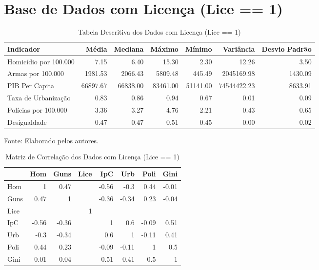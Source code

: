 \documentclass[12pt]{article}
\begin{document}
\section{\textbf{Base de Dados com Licença (Lice == 1)}}
\begin{table}[H]
\centering
\caption{Tabela Descritiva dos Dados com Licença (Lice == 1)}
\label{tab:indicadores_com_licença}
\small
\begin{tabularx}{\textwidth}{l*{6}{R}}
\hline
Indicador & Média & Mediana & Máximo & Mínimo & Variância & Desvio Padrão \\ \hline
Homicídio por 100.000 & 7.15 & 6.40 & 15.30 & 2.30 & 12.26 & 3.50 \\
Armas por 100.000 & 1981.53 & 2066.43 & 5809.48 & 445.49 & 2045169.98 & 1430.09 \\
PIB Per Capita & 66897.67 & 66838.00 & 83461.00 & 51141.00 & 74544422.23 & 8633.91 \\
Taxa de Urbanização & 0.83 & 0.86 & 0.94 & 0.67 & 0.01 & 0.09 \\
Polícias por 100.000 & 3.36 & 3.27 & 4.76 & 2.21 & 0.43 & 0.65 \\
Desigualdade & 0.47 & 0.47 & 0.51 & 0.45 & 0.00 & 0.02 \\ \hline
\end{tabularx}
\footnotesize{Fonte: Elaborado pelos autores.}
\end{table}

\begin{table}[H]
\centering
\caption{Matriz de Correlação dos Dados com Licença (Lice == 1)}
\label{tab:correlation_matrix_com_licença}
\begin{tabular}{lrrrrrrr}
\hline
      & Hom   & Guns  & Lice  & IpC   & Urb   & Poli  & Gini  \\ \hline
Hom   & 1     & 0.47  &       & -0.56 & -0.3  & 0.44  & -0.01 \\
Guns  & 0.47  & 1     &       & -0.36 & -0.34 & 0.23  & -0.04 \\
Lice  &       &       & 1     &       &       &       &       \\
IpC   & -0.56 & -0.36 &       & 1     & 0.6   & -0.09 & 0.51  \\
Urb   & -0.3  & -0.34 &       & 0.6   & 1     & -0.11 & 0.41  \\
Poli  & 0.44  & 0.23  &       & -0.09 & -0.11 & 1     & 0.5   \\
Gini  & -0.01 & -0.04 &       & 0.51  & 0.41  & 0.5   & 1     \\ \hline
\end{tabular}
\end{table}
\end{document}
